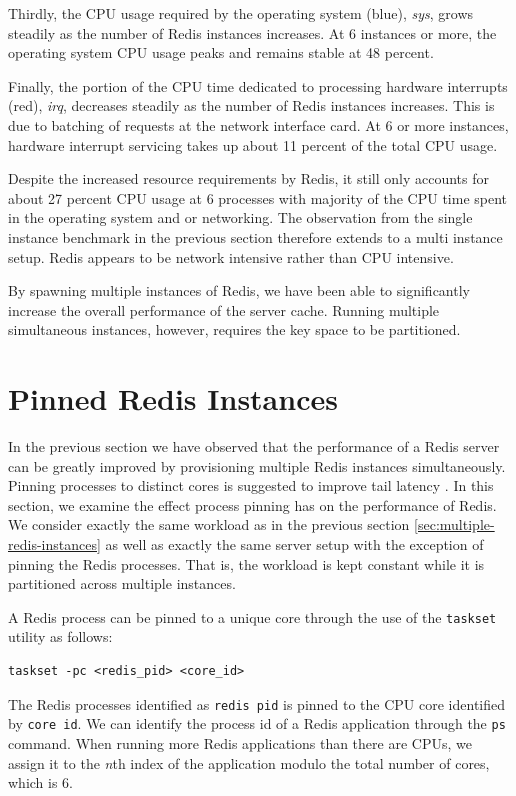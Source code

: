 Thirdly, the CPU usage required by the operating system (blue), \textit{sys}, grows steadily as the number of Redis instances increases. At 6 instances or more, the operating system CPU usage peaks and remains stable at 48 percent.

Finally, the portion of the CPU time dedicated to processing hardware interrupts (red), \textit{irq}, decreases steadily as the number of Redis instances increases. This is due to batching of requests at the network interface card. At 6 or more instances, hardware interrupt servicing takes up about 11 percent of the total CPU usage.

Despite the increased resource requirements by Redis, it still only accounts for about 27 percent CPU usage at 6 processes with majority of the CPU time spent in the operating system and or networking. The observation from the single instance benchmark in the previous section therefore extends to a multi instance setup. Redis appears to be network intensive rather than CPU intensive.


By spawning multiple instances of Redis, we have been able to significantly increase the overall performance of the server cache. Running multiple simultaneous instances, however, requires the key space to be partitioned.


\section{Pinned Redis Instances}

In the previous section we have observed that the performance of a Redis server can be greatly improved by provisioning multiple Redis instances simultaneously. Pinning processes to distinct cores is suggested to improve tail latency \cite{leverich2014reconciling}. In this section, we examine the effect process pinning has on the performance of Redis. We consider exactly the same workload as in the previous section \ref{sec:multiple-redis-instances} as well as exactly the same server setup with the exception of pinning the Redis processes. That is, the workload is kept constant while it is partitioned across multiple instances.

A Redis process can be pinned to a unique core through the use of the \texttt{taskset} utility as follows:

\begin{lstlisting}
taskset -pc <redis_pid> <core_id>
\end{lstlisting}

The Redis processes identified as \texttt{redis pid} is pinned to the CPU core identified by \texttt{core id}. We can identify the process id of a Redis application through the \texttt{ps} command. When running more Redis applications than there are CPUs, we assign it to the \textit{n}th index of the application modulo the total number of cores, which is 6.


